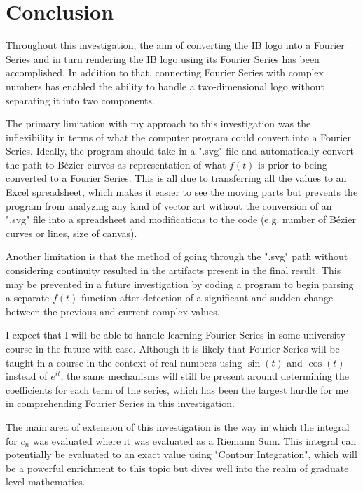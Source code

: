 \documentclass[letterpaper, 12pt]{article}
\begin{document}
\section{Conclusion}

Throughout this investigation, the aim of converting
the IB logo into a Fourier Series and in turn
rendering the IB logo using its Fourier Series has been
accomplished. In addition to that, connecting
Fourier Series with complex numbers has enabled
the ability to handle a two-dimensional
logo without separating it into two components.

The primary limitation with my approach to this investigation
was the inflexibility in terms of what the
computer program could convert into a Fourier Series.
Ideally, the program should take in a ".svg" file and
automatically convert the path to Bézier curves
as representation of what \(f(t)\) is
prior to being converted to a Fourier Series.
This is all due to transferring all the values
to an Excel spreadsheet, which makes it easier to
see the moving parts but prevents the program
from analyzing any kind of vector art
without the conversion of an ".svg" file into
a spreadsheet and modifications to the code
(e.g. number of Bézier curves or lines, size of canvas).

Another limitation is that the method of
going through the ".svg" path without
considering continuity resulted in the artifacts present
in the final result. This may be
prevented in a future investigation
by coding a program to begin
parsing a separate \(f(t)\) function
after detection of a significant and sudden
change between the previous and current
complex values.

I expect that I will be able to handle learning
Fourier Series in some university course
in the future with ease. Although it is likely
that Fourier Series will be taught in a course
in the context of real numbers using
\(\sin(t)\) and \(\cos(t)\) instead of \(e^{it}\),
the same mechanisms will still be present around
determining the coefficients for each term of
the series, which has been the largest hurdle
for me in comprehending Fourier Series in this
investigation.

The main area of extension of this investigation
is the way in which the integral for \(c_n\) was
evaluated where it was evaluated as a Riemann Sum.
This integral can potentially be evaluated
to an exact value using "Contour Integration",
which will be a powerful enrichment to this topic
but dives well into the realm of graduate level mathematics.
\end{document}
